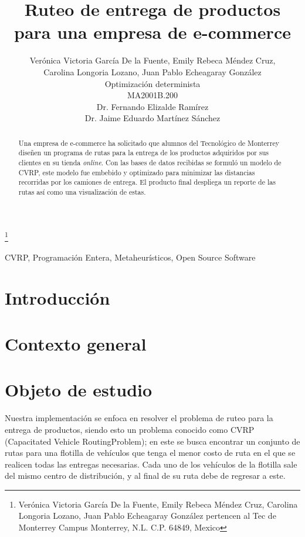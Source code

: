 \documentclass[journal]{IEEEtran}
\title{\LARGE \bf Ruteo de entrega de productos para una empresa de e-commerce}
\author{Verónica Victoria García De la Fuente, Emily Rebeca Méndez Cruz, \\Carolina Longoria Lozano, Juan Pablo Echeagaray González \\
Optimización determinista \\
MA2001B.200 \\
Dr. Fernando Elizalde Ramírez \\
Dr. Jaime Eduardo Martínez Sánchez}%
\begin{document}
    \thanks{Verónica Victoria García De la Fuente, Emily Rebeca Méndez Cruz, Carolina Longoria Lozano, Juan Pablo Echeagaray González pertencen al Tec de Monterrey Campus Monterrey, N.L. C.P. 64849, Mexico {\tt\small}}

    \maketitle

    \thispagestyle{empty}
    \pagestyle{empty}

    \begin{abstract}
        Una empresa de e-commerce ha solicitado que alumnos del Tecnológico de Monterrey diseñen un programa de rutas para la entrega de los productos adquiridos por sus clientes en su tienda \emph{online}. Con las bases de datos recibidas se formuló un modelo de CVRP, este modelo fue embebido y optimizado para minimizar las distancias recorridas por los camiones de entrega. El producto final despliega un reporte de las rutas así como una visualización de estas.
    \end{abstract}

    \begin{IEEEkeywords} 
        CVRP, Programación Entera, Metaheurísticos, Open Source Software
    \end{IEEEkeywords}

    \section{Introducción} \label{sec:intro} %

    \section{Contexto general} \label{sec:general-context}
        
    \section{Objeto de estudio} \label{sec:case-study}

        Nuestra implementación se enfoca en resolver el problema de ruteo para la entrega de productos, siendo esto un problema conocido como CVRP (Capacitated Vehicle RoutingProblem); en este se busca encontrar un conjunto de rutas para una flotilla de vehículos que tenga el menor costo de ruta en el que se realicen todas las entregas necesarias. Cada uno de los vehículos de la flotilla sale del mismo centro de distribución, y al final de su ruta debe de regresar a este.
\end{document}
